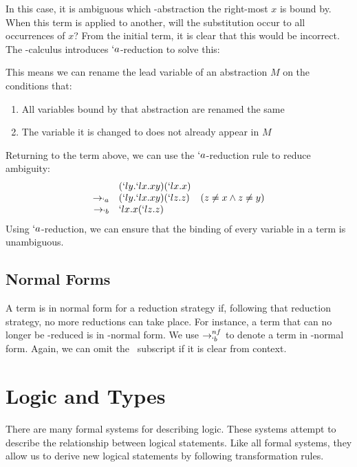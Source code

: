   In this case, it is ambiguous which \lam-abstraction the right-most $x$
  is bound by. When this term is applied to another, will the substitution
  occur to all occurrences of $x$? From the initial term, it is clear that
  this would be incorrect. The \lam-calculus introduces $`a$-reduction to
  solve this:
  \begin{figure}[H]
  \end{figure}
  This means we can rename the lead variable of an abstraction $M$ on the 
  conditions that: 
  \begin{enumerate}
    \item All variables bound by that abstraction are renamed the same 
    \item The variable it is changed to does not already appear in $M$ 
  \end{enumerate}
  Returning to the term above, we can use the $`a$-reduction rule to reduce ambiguity:
  \[
  \begin{array}{rll}
             & (`ly.`lx.xy)(`lx.x) \\
    \to_{`a} & (`ly.`lx.xy)(`lz.z) & (z \not= x \land z \not= y) \\
    \to_{`b} & `lx.x(`lz.z)
  \end{array}
  \]
  Using $`a$-reduction, we can ensure that the binding of every variable in a term is unambiguous.
  
  \subsection{Normal Forms}
 
  A term is in normal form for a reduction strategy if, 
    following that reduction strategy,
  no more reductions can take place.
  For instance, a term that can no longer be \bta-reduced is in \bta-normal form.
  We use $\to_{`b}^{nf}$ to denote a term in \bta-normal form.
  Again, we can omit the \bta\ subscript if it is clear from context.

\section{Logic and Types}

  There are many formal systems for describing logic.
  These systems attempt to describe the relationship between logical statements.
  Like all formal systems, 
  they allow us to derive new logical statements by following transformation rules.

